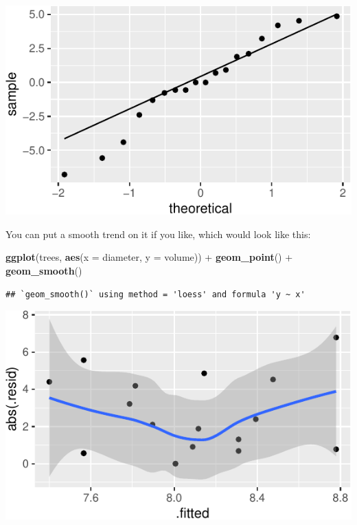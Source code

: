 \documentclass[]{tufte-book}
\newenvironment{Shaded}{}{}
\newcommand{\DataTypeTok}[1]{\textcolor[rgb]{0.56,0.13,0.00}{#1}}
\newcommand{\KeywordTok}[1]{\textcolor[rgb]{0.00,0.44,0.13}{\textbf{#1}}}
\newcommand{\NormalTok}[1]{#1}
\newcommand{\OperatorTok}[1]{\textcolor[rgb]{0.40,0.40,0.40}{#1}}
\newcommand{\StringTok}[1]{\textcolor[rgb]{0.25,0.44,0.63}{#1}}
\theoremstyle{definition}
\theoremstyle{definition}
\theoremstyle{definition}
\theoremstyle{remark}
\begin{document}
\includegraphics{12-regression_files/figure-latex/unnamed-chunk-107-1}

You can put a smooth trend on it if you like, which would look like
this:

\begin{Shaded}
\begin{Highlighting}[]
\KeywordTok{ggplot}\NormalTok{(trees, }\KeywordTok{aes}\NormalTok{(}\DataTypeTok{x =}\NormalTok{ diameter, }\DataTypeTok{y =}\NormalTok{ volume)) }\OperatorTok{+}\StringTok{ }
\StringTok{    }\KeywordTok{geom_point}\NormalTok{() }\OperatorTok{+}\StringTok{ }\KeywordTok{geom_smooth}\NormalTok{()}
\end{Highlighting}
\end{Shaded}

\begin{verbatim}
## `geom_smooth()` using method = 'loess' and formula 'y ~ x'
\end{verbatim}

\includegraphics{12-regression_files/figure-latex/unnamed-chunk-108-1}
\end{document}
